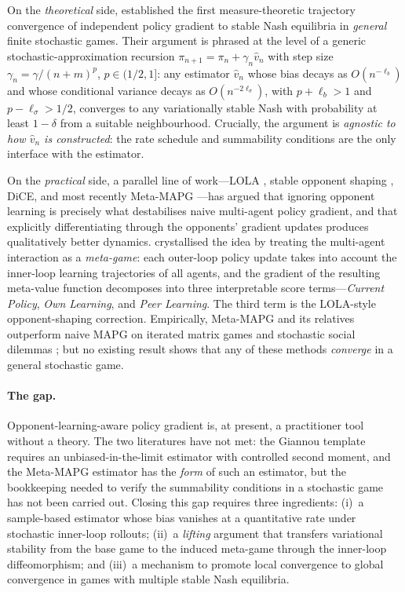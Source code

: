 \documentclass[11pt]{article}
\theoremstyle{definition}
\theoremstyle{remark}
\begin{document}
On the \emph{theoretical} side, \citet{giannou2022convergence}
established the first measure-theoretic trajectory convergence of
independent policy gradient to stable Nash equilibria in
\emph{general} finite stochastic games.  Their argument is phrased at
the level of a generic stochastic-approximation recursion
$\pi_{n+1}=\pi_n+\gamma_n \hat{v}_n$ with step size $\gamma_n=\gamma/(n+m)^p$,
$p\in(1/2,1]$: any estimator $\hat{v}_n$ whose bias decays as
$O(n^{-\ell_b})$ and whose conditional variance decays as
$O(n^{-2\ell_\sigma})$, with $p+\ell_b>1$ and $p-\ell_\sigma>1/2$,
converges to any variationally stable Nash with probability at least
$1-\delta$ from a suitable neighbourhood.  Crucially, the argument is
\emph{agnostic to how $\hat{v}_n$ is constructed}: the rate schedule and
summability conditions are the only interface with the estimator.

On the \emph{practical} side, a parallel line of work---LOLA
\citep{foerster2018lola}, stable opponent shaping
\citep{letcher2019stable}, DiCE, and most recently
Meta-MAPG \citep{kim2021meta}---has argued that ignoring opponent
learning is precisely what destabilises naive multi-agent policy
gradient, and that explicitly differentiating through the opponents'
gradient updates produces qualitatively better dynamics.
\citet{kim2021meta} crystallised the idea by treating the multi-agent
interaction as a \emph{meta-game}: each outer-loop policy update takes
into account the inner-loop learning trajectories of all agents, and
the gradient of the resulting meta-value function decomposes into
three interpretable score terms---\emph{Current Policy}, \emph{Own
Learning}, and \emph{Peer Learning}.  The third term is the
LOLA-style opponent-shaping correction.  Empirically, Meta-MAPG and
its relatives outperform naive MAPG on iterated matrix games and
stochastic social dilemmas \citep{foerster2018lola,kim2021meta}; but
no existing result shows that any of these methods \emph{converge} in
a general stochastic game.

\paragraph{The gap.}
Opponent-learning-aware policy gradient is, at present, a practitioner
tool without a theory.  The two literatures have not met: the Giannou
template requires an unbiased-in-the-limit estimator with controlled
second moment, and the Meta-MAPG estimator has the \emph{form} of such
an estimator, but the bookkeeping needed to verify the summability
conditions in a stochastic game has not been carried out.  Closing
this gap requires three ingredients: (i)~a sample-based estimator
whose bias vanishes at a quantitative rate under stochastic
inner-loop rollouts; (ii)~a \emph{lifting} argument that transfers
variational stability from the base game to the induced meta-game
through the inner-loop diffeomorphism; and (iii)~a mechanism to
promote local convergence to global convergence in games with
multiple stable Nash equilibria.
\end{document}
